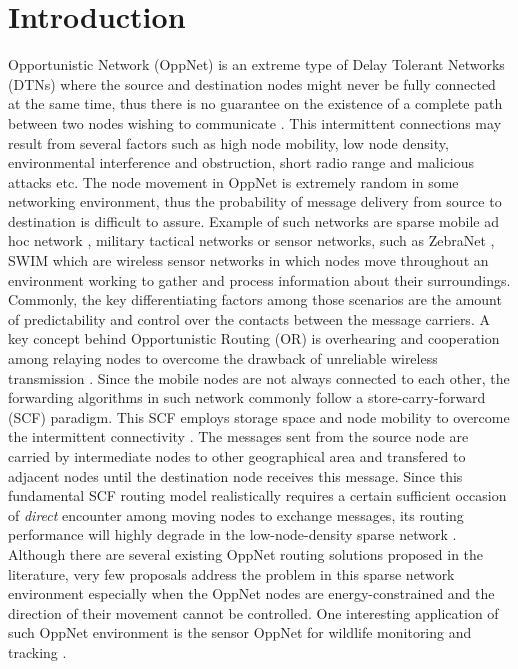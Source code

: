 \documentclass[conference]{IEEEtran}
\begin{document}
\section{Introduction}
Opportunistic Network (OppNet) is an extreme type of Delay Tolerant Networks (DTNs) where the source and destination nodes might never be fully connected at the same time, thus there is no guarantee on the existence of a complete path between two nodes wishing to communicate \cite{MWNsBook2011}.
This intermittent connections may result from several factors such as high node mobility, low node density, environmental interference and obstruction, short radio range and malicious attacks \cite{prodhan2011} etc.
The node movement in OppNet is extremely random in some networking environment, thus the probability of message delivery from source to destination is difficult to assure.
Example of such networks are sparse mobile ad hoc network \cite{Alekeish2012}, military tactical networks \cite{Scott2005,Kerdsri2013}  or sensor networks, such as ZebraNet \cite{zebranet2004}, SWIM \cite{Small2003}  which are wireless sensor networks in which nodes move throughout an environment working to gather and process information about their surroundings.
Commonly, the key differentiating factors among those scenarios are the amount of predictability and control over the contacts between the message carriers\cite{Karkkainen2013}.
A key concept behind Opportunistic Routing (OR) is overhearing and cooperation among relaying nodes to overcome the drawback of unreliable wireless transmission \cite{Liu2009}.
Since the mobile nodes are not always connected to each other, the forwarding algorithms in such network commonly follow a store-carry-forward (SCF) paradigm.
This SCF employs storage space and node mobility to overcome the intermittent connectivity \cite{Ma2011}.
The messages sent from the source node are carried by intermediate nodes to other geographical area and transfered to adjacent nodes until the destination node receives this message.
Since this fundamental SCF routing model realistically requires a certain sufficient occasion of \emph{direct} encounter among moving nodes to exchange messages, its routing performance will highly degrade in the low-node-density sparse network \cite{Spyropoulos2010}.
Although there are several existing OppNet routing solutions \cite{ Zhang2013, Chung-Ming2008, Spyropoulos2004, Grossglauser2002, Vahdat2000,Kerdsri2013} proposed in the literature, very few proposals address the problem in this sparse network environment especially when the OppNet nodes are energy-constrained \cite{Liguang2013,Eu2010} and the direction of their movement cannot be controlled.
One interesting application of such OppNet environment is the sensor OppNet for wildlife monitoring and tracking \cite{zebranet2004, Small2003}.
\end{document}

